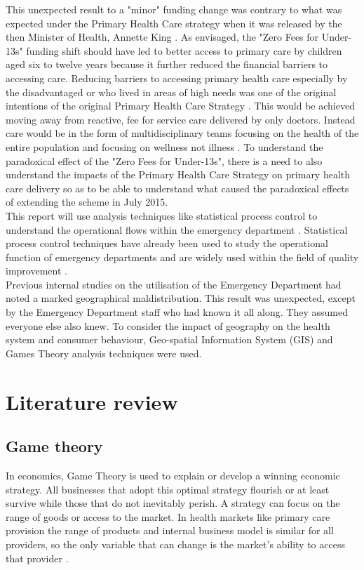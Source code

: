 \documentclass[11pt,a4paper]{article}
\begin{document}
This unexpected result to a "minor" funding change was contrary to what was expected under the Primary Health Care strategy when it was released by the then Minister of Health, Annette King \citep{king2001primary}. As envisaged, the "Zero Fees for Under-13s" funding shift should have led to better access to primary care by children aged six to twelve years because it further reduced the financial barriers to accessing care. Reducing barriers to accessing primary health care especially by the disadvantaged or who lived in areas of high needs was one of the original intentions of the original Primary Health Care Strategy \citep{king2001primary}. This would be achieved moving away from reactive, fee for service care delivered by only doctors. Instead care would be in the form of multidisciplinary teams focusing on the health of the entire population and focusing on wellness not illness \citep{king2001primary}.  To understand the paradoxical effect of the "Zero Fees for Under-13s", there is a need to also understand the impacts of the Primary Health Care Strategy on primary health care delivery so as to be able to understand what caused the paradoxical effects of extending the scheme in July 2015.\\


This report will use analysis techniques like statistical process control to understand the operational flows within the emergency department \citep{rosemann2015six, cheng2015run, epprecht2015statistical}. Statistical process control techniques have already been used to study the operational function of emergency departments \citep{pimentel2015statistical} and are widely used within the field of quality improvement \citep{provost2011health}.\\


Previous internal studies on the utilisation of the Emergency Department had noted a marked geographical maldistribution. This result was unexpected, except by the Emergency Department staff who had known it all along. They assumed everyone else also knew. To consider the impact of geography on the health system and consumer behaviour, Geo-spatial Information System (GIS) and Games Theory analysis techniques were used.\\


\section{Literature review}
\subsection{Game theory}
In economics, Game Theory is used to explain or develop a winning economic strategy. All businesses that adopt this optimal strategy flourish or at least survive while those that do not inevitably perish. A strategy can focus on the range of goods or access to the market. In health markets like primary care provision the range of products and internal business model is similar for  all providers, so the  only variable that can change is the market's ability to access that provider \citep{dinar2008game}. \\
\end{document}
